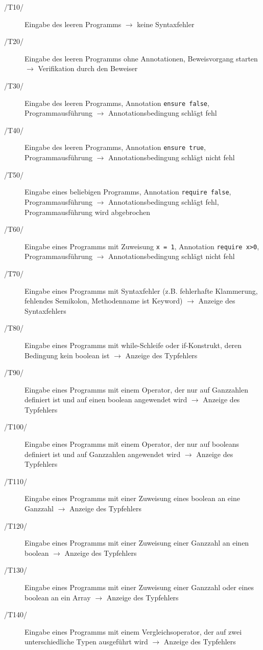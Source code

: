 \documentclass[a4paper,10pt]{article}
\begin{document}
\begin{description}
\item[/T10/] Eingabe des leeren Programms $\to$ keine Syntaxfehler
\item[/T20/] Eingabe des leeren Programms ohne Annotationen, Beweisvorgang starten $\to$ Verifikation durch den Beweiser
\item[/T30/] Eingabe des leeren Programms, Annotation \texttt{ensure false}, Programmausf\"{u}hrung $\to$ Annotationsbedingung schl\"{a}gt fehl
\item[/T40/] Eingabe des leeren Programms, Annotation \texttt{ensure true}, Programmausf\"{u}hrung $\to$ Annotationsbedingung schl\"{a}gt nicht fehl
\item[/T50/] Eingabe eines beliebigen Programms, Annotation \texttt{require false}, Programmausf\"{u}hrung $\to$ Annotationsbedingung schl\"{a}gt fehl, Programmausf\"{u}hrung wird abgebrochen
\item[/T60/] Eingabe eines Programms mit Zuweisung \texttt{x = 1}, Annotation \texttt{require x>0}, Programmausf\"{u}hrung $\to$ Annotationsbedingung schl\"{a}gt nicht fehl
\item[/T70/] Eingabe eines Programms mit Syntaxfehler (z.B. fehlerhafte Klammerung, fehlendes Semikolon, Methodenname ist Keyword) $\to$ Anzeige des Syntaxfehlers
\item[/T80/] Eingabe eines Programms mit while-Schleife oder if-Konstrukt, deren Bedingung kein boolean ist $\to$ Anzeige des Typfehlers
\item[/T90/] Eingabe eines Programms mit einem Operator, der nur auf Ganzzahlen definiert ist und auf einen boolean angewendet wird $\to$ Anzeige des Typfehlers
\item[/T100/] Eingabe eines Programms mit einem Operator, der nur auf booleans definiert ist und auf Ganzzahlen angewendet wird $\to$ Anzeige des Typfehlers
\item[/T110/] Eingabe eines Programms mit einer Zuweisung eines boolean an eine Ganzzahl $\to$ Anzeige des Typfehlers
\item[/T120/] Eingabe eines Programms mit einer Zuweisung einer Ganzzahl an einen boolean $\to$ Anzeige des Typfehlers
\item[/T130/] Eingabe eines Programms mit einer Zuweisung einer Ganzzahl oder eines boolean an ein Array $\to$ Anzeige des Typfehlers
\item[/T140/] Eingabe eines Programms mit einem Vergleichsoperator, der auf zwei unterschiedliche Typen ausgef\"{u}hrt wird $\to$ Anzeige des Typfehlers

\end{description}
\end{document}
